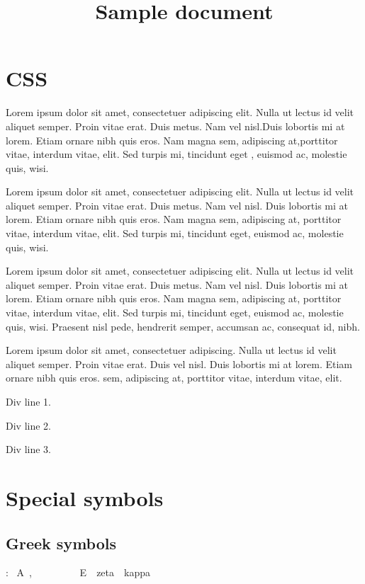 \documentclass{article}
\title{Sample document}
\begin{document}
\maketitle
\section{CSS}
\par Lorem ipsum dolor sit amet, consectetuer adipiscing elit.
 Nulla ut lectus id velit aliquet semper. Proin vitae erat. Duis metus. Nam
 vel nisl.Duis lobortis mi at lorem. Etiam ornare nibh quis eros. Nam magna 
sem, adipiscing at,porttitor vitae, interdum vitae, elit. Sed turpis mi,
 tincidunt eget , euismod ac, molestie quis, wisi.
  
\par Lorem ipsum dolor sit amet, consectetuer adipiscing elit.
 Nulla ut lectus id velit aliquet semper. Proin vitae erat. Duis metus. Nam
 vel nisl. Duis lobortis mi at lorem. Etiam ornare nibh quis eros. Nam magna 
sem, adipiscing at, porttitor vitae, interdum vitae, elit. Sed turpis mi,
 tincidunt eget, euismod ac, molestie quis, wisi.
  
\par Lorem ipsum dolor sit amet, consectetuer adipiscing elit.
 Nulla ut lectus id velit aliquet semper. Proin vitae erat. Duis metus. Nam
 vel nisl. Duis lobortis mi at lorem. Etiam ornare nibh quis eros. Nam magna 
sem, adipiscing at, porttitor vitae, interdum vitae, elit. Sed turpis mi,
 tincidunt eget, euismod ac, molestie quis, wisi. Praesent nisl pede,
 hendrerit semper, accumsan ac, consequat id, nibh.
\par Lorem ipsum dolor sit amet, consectetuer adipiscing.
 Nulla ut lectus id velit aliquet semper. Proin vitae erat. Duis
 vel nisl. Duis lobortis mi at lorem. Etiam ornare nibh quis eros. 
sem, adipiscing at, porttitor vitae, interdum vitae, elit.
\par Div line 1. 
\par Div line 2. 
\par Div line 3.

\section{Special symbols}
\subsection{Greek symbols}
\par {}: \ A\  , \ \Gamma\ \ \Theta\ \ \Xi\ \ \Pi\ \ E\ \ zeta\ \ kappa\ \ \lambda\ 
\end{document}
